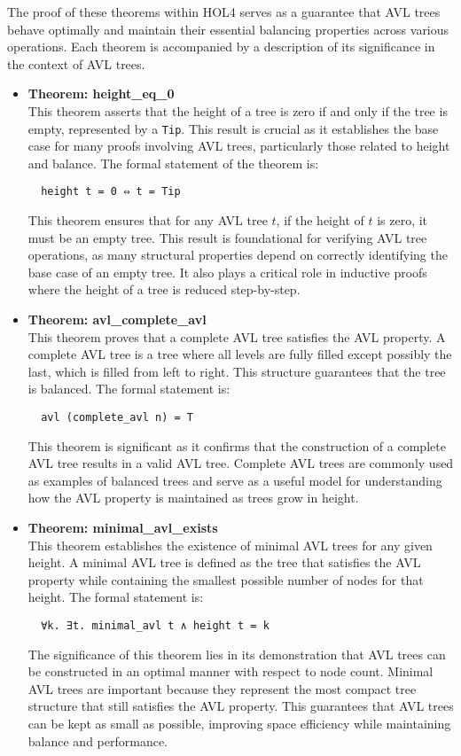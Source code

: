 \documentclass[12pt]{article}
\begin{document}
The proof of these theorems within HOL4 serves as a guarantee that AVL trees behave optimally and maintain their essential balancing properties across various operations. Each theorem is accompanied by a description of its significance in the context of AVL trees.

\begin{itemize}

  \item \textbf{Theorem: height\_eq\_0} \\
  This theorem asserts that the height of a tree is zero if and only if the tree is empty, represented by a \texttt{Tip}. This result is crucial as it establishes the base case for many proofs involving AVL trees, particularly those related to height and balance. The formal statement of the theorem is:
  \begin{verbatim}
  height t = 0 ⇔ t = Tip
  \end{verbatim}
  This theorem ensures that for any AVL tree \( t \), if the height of \( t \) is zero, it must be an empty tree. This result is foundational for verifying AVL tree operations, as many structural properties depend on correctly identifying the base case of an empty tree. It also plays a critical role in inductive proofs where the height of a tree is reduced step-by-step.

  \item \textbf{Theorem: avl\_complete\_avl} \\
  This theorem proves that a complete AVL tree satisfies the AVL property. A complete AVL tree is a tree where all levels are fully filled except possibly the last, which is filled from left to right. This structure guarantees that the tree is balanced. The formal statement is:
  \begin{verbatim}
  avl (complete_avl n) = T
  \end{verbatim}
  This theorem is significant as it confirms that the construction of a complete AVL tree results in a valid AVL tree. Complete AVL trees are commonly used as examples of balanced trees and serve as a useful model for understanding how the AVL property is maintained as trees grow in height.

  \item \textbf{Theorem: minimal\_avl\_exists} \\
  This theorem establishes the existence of minimal AVL trees for any given height. A minimal AVL tree is defined as the tree that satisfies the AVL property while containing the smallest possible number of nodes for that height. The formal statement is:
  \begin{verbatim}
  ∀k. ∃t. minimal_avl t ∧ height t = k
  \end{verbatim}
  The significance of this theorem lies in its demonstration that AVL trees can be constructed in an optimal manner with respect to node count. Minimal AVL trees are important because they represent the most compact tree structure that still satisfies the AVL property. This guarantees that AVL trees can be kept as small as possible, improving space efficiency while maintaining balance and performance.


\end{itemize}
\end{document}
